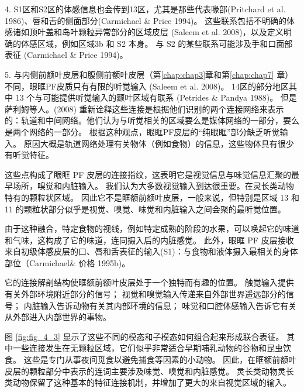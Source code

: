 4. S1区和S2区的体感信息也会传到13区，尤其是那些代表喙部(Pritchard et al. 1986)、唇和舌的侧面部分(Carmichael \& Price 1994)。
这些联系包括不明确的体感诸如顶叶盖和岛叶颗粒异常部分的区域皮层 (Saleem et al. 2008)，以及定义明确的体感区域，例如区域3b 和 S2 本身。
与 S2 的某些联系可能涉及手和口面部表征 (Carmichael \& Price 1994)。\par


5. 与内侧前额叶皮层和腹侧前额叶皮层（第\ref{chap:chap3}章和第\ref{chap:chap7} 章）不同，眼眶PF皮质只有有限的听觉输入 (Saleem et al. 2008)。
14区的部分地区其中 13 个与可能提供听觉输入的颞叶区域有联系 (Petrides \& Pandya 1988)。
但是萨利姆等人。(2008) 重新诠释这些连接是根据他们识别的两个连接网络来表示的：轨道和中间网络。他们认为与听觉相关的区域要么是媒体网络的一部分，要么是两个网络的一部分。
根据这种观点，眼眶PF皮层的“纯眼眶”部分缺乏听觉输入。
原因大概是轨道网络处理有关物体（例如食物）的信息，这些物体具有很少有听觉特征。\par


这些点构成了眼眶 PF 皮层的连接指纹，这表明它是视觉信息与味觉信息汇聚的最早场所，嗅觉和内脏输入。
我们认为大多数视觉输入到达很重要。在灵长类动物特有的颗粒状区域。
因此它不是眶额前额叶皮层，一般来说，但特别是区域 13 和 11 的颗粒状部分似乎是视觉、嗅觉、味觉和内脏输入之间会聚的最听觉位置。\par


由于这种融合，特定食物的视线，例如特定成熟的阶段的水果，可以唤起它的味道和气味，这构成了它的味道，连同摄入后的内脏感觉。
此外，眼眶 PF 皮层接收来自初级体感皮层的口、唇和舌表征的输入(S1)：与食物和液体摄入最相关的身体部位（Carmichael\& 价格 1995b)。\par


它的连接解剖结构使眶额前额叶皮层处于一个独特而有趣的位置。
触觉输入提供有关外部环境附近部分的信号；
视觉和嗅觉输入传递来自外部世界遥远部分的信号；
内脏输入告诉动物有关其内部环境的信息；
味觉和口腔体感输入告诉它有关从外部进入内部世界的事物。\par


图 \ref{fig:fig_4_3} 显示了这些不同的模态和子模态如何组合起来形成联合表征。
其中一些连接发生在无颗粒区域，它们似乎非常适合早期哺乳动物的谷物和昆虫饮食。
这些是专门从事夜间觅食以避免捕食等因素的小动物。
因此，在眶额前额叶皮层的颗粒部分中表示的连词主要涉及味觉、嗅觉和内脏感觉。
灵长类动物灵长类动物保留了这种基本的特征连接机制，并增加了更大的来自视觉区域的输入。\par


